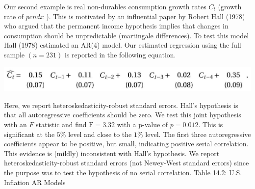 \documentclass[10pt]{article}
\begin{document}
Our second example is real non-durables consumption growth rates $C_{t}$ (growth rate of $p c n d x$ ). This is motivated by an influential paper by Robert Hall (1978) who argued that the permanent income hypothesis implies that changes in consumption should be unpredictable (martingale differences). To test this model Hall (1978) estimated an AR(4) model. Our estimated regression using the full sample $(n=231)$ is reported in the following equation.

\includegraphics[max width=\textwidth]{2022_10_23_6047885e7d154c9f28afg-45}

Here, we report heteroskedasticity-robust standard errors. Hall's hypothesis is that all autoregressive coefficients should be zero. We test this joint hypothesis with an $F$ statistic and find $\mathrm{F}=3.32$ with a p-value of $p=0.012$. This is significant at the $5 \%$ level and close to the $1 \%$ level. The first three autoregressive coefficients appear to be positive, but small, indicating positive serial correlation. This evidence is (mildly) inconsistent with Hall's hypothesis. We report heteroskedasticity-robust standard errors (not Newey-West standard errors) since the purpose was to test the hypothesis of no serial correlation. Table 14.2: U.S. Inflation AR Models
\end{document}
